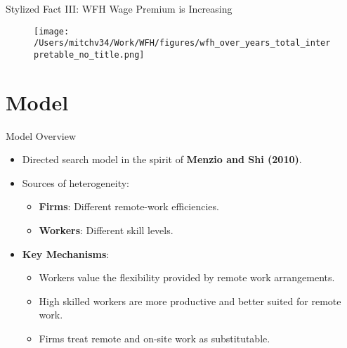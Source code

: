 \documentclass[aspectratio=1610]{beamer}
\begin{document}
\begin{frame}[label=wfhyears_main]{Stylized Fact III: WFH Wage Premium is Increasing}
\begin{figure}[H]
    \centering
    \texttt{[image: /Users/mitchv34/Work/WFH/figures/wfh\_over\_years\_total\_interpretable\_no\_title.png]}
    \label{wfh_over_time}
    \hyperlink{wfhyears_appendix}{}
\end{figure}
\end{frame}

\section{Model}
\begin{frame}{Model Overview}
  \begin{itemize}
    \item Directed search model in the spirit of \textbf{Menzio and Shi (2010)}.\pause \vspace{0.3cm}
    \item Sources of heterogeneity:\vspace{0.3cm}
    \begin{itemize} 
      \item \textbf{Firms}: Different remote-work efficiencies.
      \item \textbf{Workers}: Different skill levels.
    \end{itemize}\pause \vspace{0.3cm}
    \item \textbf{Key Mechanisms}:\vspace{0.3cm}
    \begin{itemize}
        \item  Workers value the flexibility provided by remote work arrangements.
        \item High skilled workers are more productive and better suited for remote work.
        \item Firms treat remote and on-site work as substitutable.
    \end{itemize}
  \end{itemize}
\end{frame}
\end{document}
